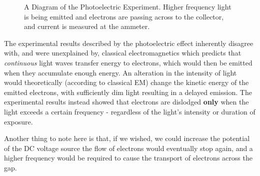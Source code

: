 \documentclass[colorlinks,11pt,a4paper,normalphoto,withhyper,ragged2e]{altareport}
\begin{document}
\begin{figure}[!h]
		
		\caption{A Diagram of the Photoelectric Experiment. Higher frequency light is being emitted and electrons are passing across to the collector, and current is measured at the ammeter.}
		\label{fig:photoelectric_effect_experiment_high_freq}
	\end{figure}
	
	
	The experimental results described by the photoelectric effect inherently disagree with, and were unexplained by, classical electromagnetics which predicts that \textit{continuous} light waves transfer energy to electrons, which would then be emitted when they accumulate enough energy. An alteration in the intensity of light would theoretically (according to classical EM) change the kinetic energy of the emitted electrons, with sufficiently dim light resulting in a delayed emission. The experimental results instead showed that electrons are dislodged \textbf{only} when the light exceeds a certain frequency - regardless of the light's intensity or duration of exposure. \linebreak
	
	Another thing to note here is that, if we wished, we could increase the potential of the DC voltage source the flow of electrons would eventually stop again, and a higher frequency would be required to cause the transport of electrons across the gap. \linebreak
	
\end{document}
